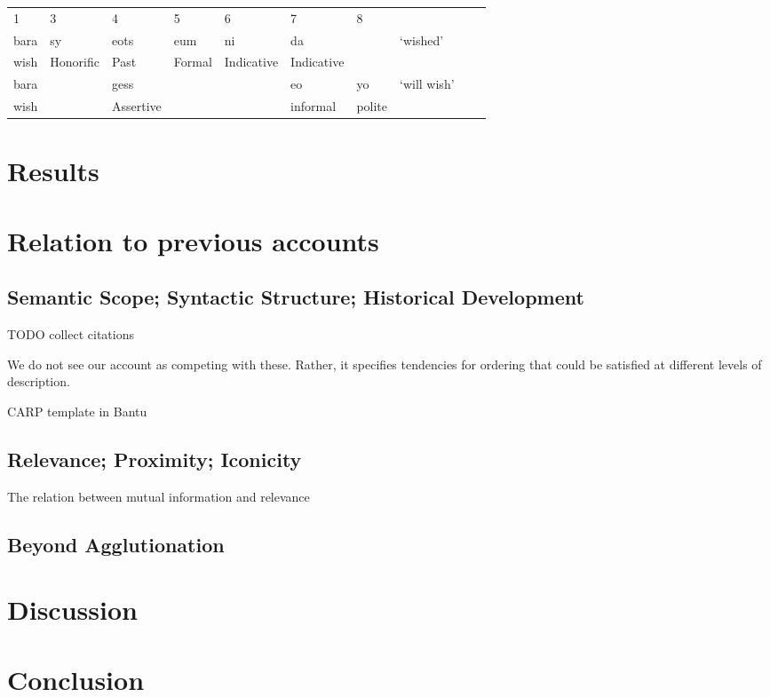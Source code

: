 \documentclass[11pt,letterpaper]{article}
\begin{document}
\begin{tabular}{llllllllll}
1    & 3 & 4     & 5   & 6  & 7 & 8 \\
bara & sy & eots & eum & ni & da  & &  `wished'\\
wish & Honorific & Past & Formal & Indicative & Indicative \\
bara& & gess &  & &  eo & yo  &  `will wish' \\
wish  & &  Assertive && & informal & polite \\
\end{tabular}


\section{Results}

\section{Relation to previous accounts}

\subsection{Semantic Scope; Syntactic Structure; Historical Development}

TODO collect citations

We do not see our account as competing with these. Rather, it specifies tendencies for ordering that could be satisfied at different levels of description.

CARP template in Bantu

\subsection{Relevance; Proximity; Iconicity}

The relation  between mutual information and relevance

\subsection{Beyond Agglutionation}

\section{Discussion}




\section{Conclusion}



\end{document}

